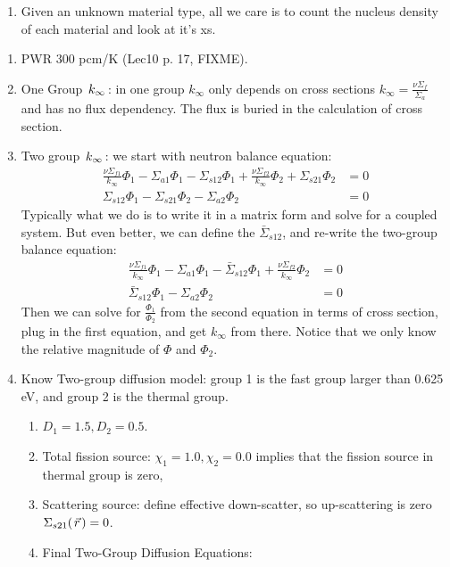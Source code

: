 \documentclass{school-22.211-notes}
\begin{document}
\begin{enumerate}
\item Given an unknown material type, all we care is to count the nucleus density of each material and look at it's xs. 
\end{enumerate}


\clearpage
{}
\begin{enumerate}
\item PWR 300 pcm/K (Lec10 p. 17, FIXME). 

\item One Group $\left. k_{\infty} \right.$: in one group $k_{\infty}$ only depends on cross sections $k_{\infty} = \frac{\nu \Sigma_f}{\Sigma_a}$ and has no flux dependency. The flux is buried in the calculation of cross section.

\item Two group $\left. k_{\infty} \right.$: we start with neutron balance equation:
  \begin{align}
    \frac{\nu \Sigma_{f1}}{k_{\infty}} \Phi_1 - \Sigma_{a1} \Phi_1 - \Sigma_{s12} \Phi_1 + \frac{\nu \Sigma_{f2}}{k_{\infty}} \Phi_2 + \Sigma_{s21} \Phi_2 &= 0 \\
\Sigma_{s12} \Phi_1 - \Sigma_{s21} \Phi_2 - \Sigma_{a2} \Phi_2 &= 0 
  \end{align}
  Typically what we do is to write it in a matrix form and solve for a coupled system. But even better, we can define the  $\bar{\Sigma}_{s12}$, and re-write the two-group balance equation: 
  \begin{align}
    \frac{\nu \Sigma_{f1}}{k_{\infty}} \Phi_1 - \Sigma_{a1} \Phi_1 - \bar{\Sigma}_{s12} \Phi_1 + \frac{\nu \Sigma_{f2}}{k_{\infty}} \Phi_2 &= 0 \\
    \bar{\Sigma}_{s12} \Phi_1- \Sigma_{a2} \Phi_2 &= 0 
  \end{align}
  Then we can solve for $\frac{\Phi_1}{\Phi_2}$ from the second equation in terms of cross section, plug in the first equation, and get $k_{\infty}$ from there. Notice that we only know the relative magnitude of $\Phi$ and $\Phi_2$. 

\item Know Two-group diffusion model: group 1 is the fast group larger than 0.625 eV, and group 2 is the thermal group. 
\begin{enumerate}
\item $D_1 = 1.5, D_2 = 0.5$.
\item Total fission source: $\chi_1 = 1.0, \chi_2 = 0.0$ implies that the fission source in thermal group is zero,
\item Scattering source: define effective down-scatter, so up-scattering is zero $\Sigma_{s21} (\left.\vec{r}\right.) = 0$. 
\item Final Two-Group Diffusion Equations: 
\end{enumerate}


\end{enumerate}
\end{document}
